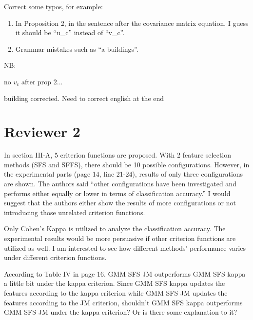 \documentclass[a4paper,10pt,DIV=16]{scrartcl}
\begin{document}
\begin{revbox}
  Correct some typos, for example:
  \begin{enumerate}
    \item In Proposition 2, in the sentence after the covariance matrix equation, I guess it should be ``u\_c'' instead of ``v\_c''.
    \item Grammar mistakes such as ``a buildings''.
  \end{enumerate}
  \begin{resbox}
    NB:

    no $v_c$ after prop 2...

    building corrected. Need to correct english at the end
  \end{resbox}
\end{revbox}

\section{Reviewer 2}
\begin{revbox}
  In section III-A, 5 criterion functions are proposed. With 2 feature selection methods (SFS and SFFS), there should be 10 possible configurations. However, in the experimental parts (page 14, line 21-24), results of only three configurations are shown. The authors said “other configurations have been investigated and performs either equally or lower in terms of classification accuracy.” I would suggest that the authors either show the results of more configurations or not introducing those unrelated criterion functions.
  \begin{resbox}

  \end{resbox}
\end{revbox}

\begin{revbox}
  Only Cohen’s Kappa is utilized to analyze the classification accuracy. The experimental results would be more persuasive if other criterion functions are utilized as well. I am interested to see how different methods’ performance varies under different criterion functions.
  \begin{resbox}

  \end{resbox}
\end{revbox}

\begin{revbox}
  According to Table IV in page 16. GMM SFS JM outperforms GMM SFS kappa a little bit under the kappa criterion. Since GMM SFS kappa updates the features according to the kappa criterion while GMM SFS JM updates the features according to the JM criterion, shouldn’t GMM SFS kappa outperforms GMM SFS JM under the kappa criterion? Or is there some explanation to it?
  \begin{resbox}

  \end{resbox}
\end{revbox}
\end{document}
